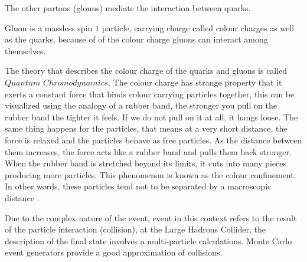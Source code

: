 The other partons (glouns)
mediate the interaction between quarks. 

Gluon is a massless spin $1$ particle, carrying charge called colour charges as well as the quarks, because of of the colour charge gluons can interact among themselves.

The theory that describes the colour charge of the quarks and gluons is called $Quantum$ $Chromodynamics$.
The colour charge has strange property that it exerts a constant force that binds colour carrying particles together, this can be visualized using the analogy of a rubber band, the stronger you pull on the rubber band the tighter it feels.
If we do not pull on it at all, it hangs loose. The same thing happens for the particles,  that means at a very short distance, the force is relaxed and the particles behave as free particles. As the distance between them increases, the force acts like a rubber band and pulls them back stronger. When the rubber band is stretched beyond its limits, it cuts into many pieces producing more particles. This phenomenon is known as the colour confinement. In other words, these particles tend not to be separated by a macroscopic distance
 \citep{particle}.

 Due to the complex nature of the event, event in this context refers to the result of the particle interaction (collision), at the Large Hadrons Collider, the description of the final state involves a multi-particle calculations.
 Monte Carlo event generators provide a good approximation of collisions.\label{sec}

